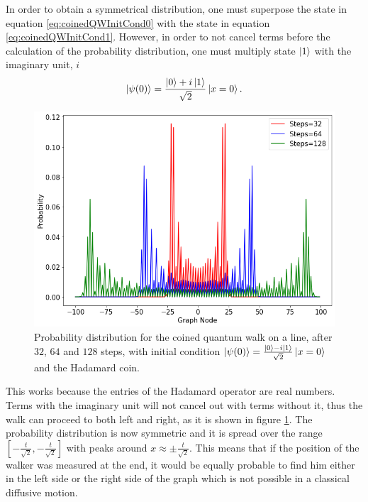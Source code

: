 \documentclass[../../dissertation.tex]{subfiles}
\begin{document}
In order to obtain a symmetrical distribution, one must superpose the state in
equation \eqref{eq:coinedQWInitCond0} with the state in equation
\ref{eq:coinedQWInitCond1}. However, in order to not cancel terms before the
calculation of the probability distribution, one must multiply state $\ket{1}$
with the imaginary unit, $i$ 
\begin{equation}
	\ket{\psi(0)} = \frac{\ket{0}+i\ket{1}}{\sqrt{2}}\ket{x=0}.
	\label{eq:coinedSimulSupInit}
\end{equation}
\begin{figure}[!ht]
	\centering
	\includegraphics[scale=0.40]{img/CoinedQuantumWalk/CoinedMultiple_psi01_3264128}
	\caption{Probability distribution for the coined quantum walk on a line, after $32$, $64$ and $128$ steps, with initial condition $\ket{\psi(0)}=\frac{\ket{0}-i\ket{1}}{\sqrt{2}}\ket{x=0}$ and the Hadamard coin.} 
	\label{fig:coinedQWDist01}
\end{figure}
This works because the entries of the Hadamard operator are real numbers. Terms
with the imaginary unit will not cancel out with terms without it, thus the
walk can proceed to both left and right, as it is shown in figure
\ref{fig:coinedQWDist01}.  The probability distribution is now symmetric and it
is spread over the range $[-\frac{t}{\sqrt{2}},-\frac{t}{\sqrt{2}}]$ with peaks
around $x \approx \pm \frac{t}{\sqrt{2}}$. This means that if the position of
the walker was measured at the end, it would be equally probable to find him
either in the left side or the right side of the graph which is not possible
in a classical diffusive motion.\par 
\end{document}
